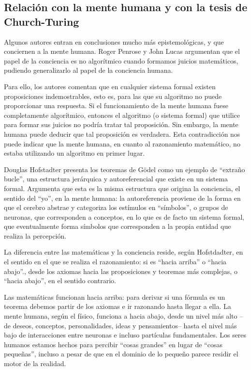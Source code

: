 \subsection{Relación con la mente humana y con la tesis de Church-Turing}\label{subsec:mente-humana-tesis-church-turing}

Algunos autores entran en conclusiones mucho más epistemológicas, y que conciernen a la mente humana. Roger Penrose y John Lucas \cite{Penrose1989, Lucas1961} argumentan que el papel de la conciencia es no algorítmico cuando formamos juicios matemáticos, pudiendo generalizarlo al papel de la conciencia humana.

Para ello, los autores comentan que en cualquier sistema formal existen proposiciones indemostrables, esto es, para las que su algoritmo no puede proporcionar una respuesta. Si el funcionamiento de la mente humana fuese completamente algorítmico, entonces el algoritmo (o sistema formal) que utilice para formar sus juicios no podría tratar tal proposición. Sin embargo, la mente humana puede deducir que tal proposición es verdadera. Esta contradicción nos puede indicar que la mente humana, en cuanto al razonamiento matemático, no estaba utilizando un algoritmo en primer lugar.

Douglas Hofstadter \cite{Hofstadter1999, Hofstadter2007} presenta los teoremas de Gödel como un ejemplo de ``extraño bucle'', una estructura jerárquica y autoreferencial que existe en un sistema formal. Argumenta que esta es la misma estructura que origina la conciencia, el sentido del ``yo'', en la mente humana: la autoreferencia proviene de la forma en que el cerebro abstrae y categoriza los estímulos en ``símbolos'', o grupos de neuronas, que corresponden a conceptos, en lo que es de facto un sistema formal, que eventualmente forma símbolos que corresponden a la propia entidad que realiza la percepción. 

La diferencia entre las matemáticas y la conciencia reside, según Hofstdadter, en el sentido en el que se realiza el razonamiento: si es ``hacia arriba'' o ``hacia abajo''., desde los axiomas hacia las proposiciones y teoremas más complejas, o ``hacia abajo'', en el sentido contrario.

Las matemáticas funcionan hacia arriba: para derivar si una fórmula es un teorema debemos partir de los axiomas e ir razonando hasta llegar a ella. La mente humana, según el físico, funciona a hacia abajo, desde un nivel más alto --de deseos, conceptos, personalidades, ideas y pensamientos-- hasta el nivel más bajo de interacciones entre neuronas e incluso partículas fundamentales. Los seres humanos estamos hechos para percibir ``cosas grandes'' en lugar de ``cosas pequeñas'', incluso a pesar de que en el dominio de lo pequeño parece residir el motor de la realidad.

